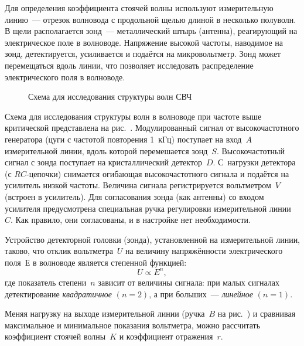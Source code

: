
Для определения коэффициента стоячей волны используют измерительную
линию~--- отрезок волновода с продольной щелью длиной в несколько полуволн. В
щели располагается зонд~--- металлический штырь (антенна), реагирующий
на электрическое поле в волноводе. Напряжение высокой частоты, наводимое на
зонд, детектируется, усиливается и подаётся на микровольтметр. Зонд может
перемещаться вдоль линии, что позволяет исследовать распределение 
электрического поля в волноводе.

\begin{figure}[h!]
    \centering
    {\small{}}
    \caption{Схема для исследования структуры волн СВЧ} 
\end{figure}

Схема для исследования структуры волн в волноводе при частоте выше
критической представлена на рис.~. Модулированный
сигнал от высокочастотного генератора (цуги с частотой повторения 1~кГц)
поступает на вход~$A$ измерительной линии, вдоль которой перемешается зонд~$S$.
Высокочастотный сигнал с зонда поступает на кристаллический 
детектор~$D$.
С~нагрузки детектора (с $RC$-цепочки) снимается огибающая высокочастотного
сигнала и подаётся на усилитель низкой частоты. Величина сигнала регистрируется
вольтметром~$V$ (встроен в усилитель). 
Для согласования зонда (как антенны) со входом усилителя 
предусмотрена специальная ручка регулировки измерительной линии~$C$. 
Как правило, они согласованы, и в настройке нет необходимости. 




Устройство детекторной головки (зонда), установленной на измерительной линии, 
таково, что отклик вольтметра~$U$ на величину напряжённости электрического 
поля~$Е$ в волноводе является степенной функцией:
\begin{equation*} 
U\propto E^{n}, 
\end{equation*}
где показатель степени~$n$ зависит от величины сигнала: 
при малых сигналах детектирование \emph{квадратичное} $(n=2)$, 
а при больших~--- \emph{линейное} $(n=1)$.

Меняя нагрузку на выходе измерительной линии (ручка~$B$ 
на рис.~) и сравнивая максимальное 
и минимальное показания вольтметра, можно рассчитать коэффициент 
стоячей волны~$K$ и коэффициент отражения~$r$.


